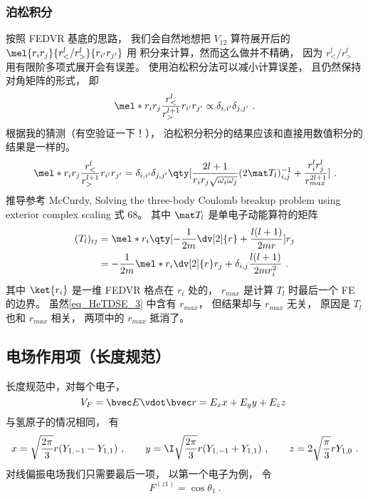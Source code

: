 \subsubsection{泊松积分}
按照 FEDVR 基底的思路， 我们会自然地想把 $V_{12}$ 算符展开后的 $\mel{r_i r_j}{r_<^l/r_>^l}{r_{i'} r_{j'}}$ 用 积分来计算，然而这么做并不精确， 因为 $r_<^l/r_>^l$ 用有限阶多项式展开会有误差。 使用泊松积分法可以减小计算误差， 且仍然保持对角矩阵的形式， 即
\begin{equation}
\mel*{r_i r_j}{\frac{r_<^l}{r_>^{l+1}}}{r_{i'} r_{j'}} \propto \delta_{i,i'} \delta_{j,j'}~.
\end{equation}
根据我的猜测（有空验证一下！）， 泊松积分积分的结果应该和直接用数值积分的结果是一样的。
\begin{equation}\label{eq_HeTDSE_3}
\mel*{r_i r_j}{\frac{r_<^l}{r_>^{l+1}}}{r_{i'} r_{j'}} = \delta_{i,i'} \delta_{j,j'} \qty[\frac{2l+1}{r_i r_j \sqrt{\omega_i \omega_j}} (2\mat T_l)^{-1}_{i,j} + \frac{r_i^l r_j^l}{r_{max}^{2l+1}}]~.
\end{equation}
推导参考 McCurdy, Solving the three-body Coulomb breakup problem using exterior complex scaling 式 68。 其中 $\mat T_l$ 是单电子动能算符的矩阵
\begin{equation}
\begin{aligned}
(T_l)_{ij} &= \mel*{r_i}{\qty[-\frac{1}{2m}\dv[2]{r} + \frac{l(l+1)}{2mr}]}{r_j}\\
&= -\frac{1}{2m} \mel*{r_i}{\dv[2]{r}}{r_j} + \delta_{i,j}\frac{l(l+1)}{2mr_i^2}~.
\end{aligned}
\end{equation}
其中 $\ket{r_i}$ 是一维 FEDVR 格点在 $r_i$ 处的， $r_{max}$ 是计算 $T_l$ 时最后一个 FE 的边界。 虽然\autoref{eq_HeTDSE_3} 中含有 $r_{max}$， 但结果却与 $r_{max}$ 无关， 原因是 $T_l$ 也和 $r_{max}$ 相关， 两项中的 $r_{max}$ 抵消了。

\subsection{电场作用项（长度规范）}
长度规范中，对每个电子，
\begin{equation}\label{eq_HeTDSE_12}
V_F = \bvec E \vdot \bvec r = E_x x + E_y y + E_z z~
\end{equation}
与氢原子的情况相同， 有
\begin{equation}
x = \sqrt{\frac{2\pi}{3}} r (Y_{1,-1} - Y_{1,1})~, \qquad
y = \I \sqrt{\frac{2\pi}{3}} r (Y_{1,-1}+Y_{1,1}) ~,\qquad
z =2\sqrt{\frac{\pi}{3}} rY_{1,0}~.
\end{equation}
对线偏振电场我们只需要最后一项， 以第一个电子为例， 令
\begin{equation}\label{eq_HeTDSE_20}
F^{(z1)} = \cos\theta_1~.
\end{equation}

